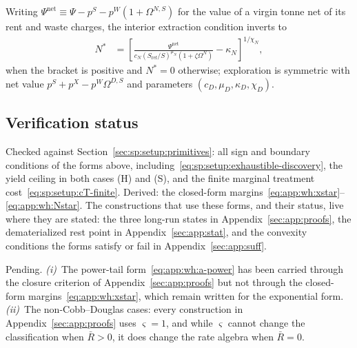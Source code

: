  Writing $\Psi^{\mathrm{net}}\equiv\Psi-p^S-p^W\left(1+\Omega^{N,S}\right)$ for the value of a virgin tonne net of its rent and waste charges, the interior extraction condition inverts to
\begin{align}
N^* &= \left[\frac{\Psi^{\mathrm{net}}}{c_N\left(S_{\mathrm{ref}}/S\right)^{\mu_N}\left(1+\zeta\Omega^N\right)}-\kappa_N\right]^{1/\chi_N},
\label{eq:app:wh:Nstar}
\end{align}
when the bracket is positive and $N^*=0$ otherwise; exploration is symmetric with net value $p^S+p^X-p^W\Omega^{D,S}$ and parameters $\left(c_D,\mu_D,\kappa_D,\chi_D\right)$.

\subsection{Verification status}\label{sec:app:workhorse:status}

Checked against Section~\ref{sec:sp:setup:primitives}: all sign and boundary conditions of the forms above, including~\eqref{eq:sp:setup:exhaustible-discovery}, the yield ceiling in both cases (H) and (S), and the finite marginal treatment cost~\eqref{eq:sp:setup:cT-finite}. Derived: the closed-form margins~\eqref{eq:app:wh:xstar}--\eqref{eq:app:wh:Nstar}. The constructions that use these forms, and their status, live where they are stated: the three long-run states in Appendix~\ref{sec:app:proofs}, the dematerialized rest point in Appendix~\ref{sec:app:stat}, and the convexity conditions the forms satisfy or fail in Appendix~\ref{sec:app:suff}.

Pending. \emph{(i)}~The power-tail form~\eqref{eq:app:wh:a-power} has been carried through the closure criterion of Appendix~\ref{sec:app:proofs} but not through the closed-form margins~\eqref{eq:app:wh:xstar}, which remain written for the exponential form. \emph{(ii)}~The non-Cobb--Douglas cases: every construction in Appendix~\ref{sec:app:proofs} uses $\varsigma=1$, and while $\varsigma$ cannot change the classification when $\bar R>0$, it does change the rate algebra when $\bar R=0$.
